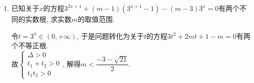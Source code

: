 \begin{enumerate}
    \item 已知关于$x$的方程$3^{2x+1}+(m-1)(3^{x+1}-1)-(m-3)3^x=0$有两个不同的实数根, 求实数$m$的取值范围. 
    \begin{jieda}
    令$t=3^x\in(0,+\infty)$, 于是问题转化为关于$t$的方程$3t^2+2mt+1-m=0$有两个不等正根. \\
    故$\begin{cases}
    \Delta>0\\
    t_1+t_2>0\\
    t_1t_2>0
    \end{cases}$, 解得$m<\dfrac{-3-\sqrt{21}}{2}$. 
    \end{jieda}
    \begin{vspace_}
        \vsp[3]
    \end{vspace_}
\end{enumerate}

